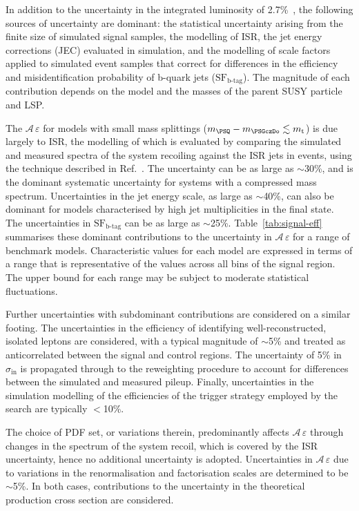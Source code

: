 In addition to the uncertainty in the integrated luminosity of
2.7\%~\cite{CMS:2016eto}, the following sources of uncertainty are
dominant: the statistical uncertainty arising from the finite size of
simulated signal samples, the modelling of ISR, the jet energy
corrections (JEC) evaluated in simulation, and the modelling of scale
factors applied to simulated event samples that correct for
differences in the efficiency and misidentification probability of
b-quark jets ($\text{SF}_\text{b-tag}$). The magnitude of each
contribution depends on the model and the masses of the parent
SUSY particle and LSP.

The $\mathcal{A}\,\varepsilon$ for models with small mass
splittings (\eg $m_{\PSQ} - m_{\PSGczDo} \lesssim m_{\text t}$) is due
largely to ISR, the modelling of which is evaluated by comparing the
simulated and measured \pt spectra of the system recoiling against the
ISR jets in \ttbar events, using the technique described in
Ref.~\cite{single-lepton-stop}. The uncertainty can be as large as
$\sim$30\%, and is the dominant systematic uncertainty for systems
with a compressed mass spectrum. Uncertainties in the jet energy
scale, as large as $\sim$40\%, can also be dominant for models
characterised by high jet multiplicities in the final state. The
uncertainties in $\text{SF}_\text{b-tag}$ can be as large as
$\sim$25\%. Table~\ref{tab:signal-eff} summarises these dominant
contributions to the uncertainty in $\mathcal{A}\,\varepsilon$ for
a range of benchmark models. Characteristic values for each model are
expressed in terms of a range that is representative of the values
across all bins of the signal region. The upper bound for each range
may be subject to moderate statistical fluctuations.

Further uncertainties with subdominant contributions are considered on
a similar footing. The uncertainties in the efficiency of identifying
well-reconstructed, isolated leptons are considered, with a typical
magnitude of $\sim$5\% and treated as anticorrelated between the
signal and control regions. The uncertainty of 5\% in
$\sigma_\text{in}$ is propagated through to the reweighting procedure
to account for differences between the simulated and measured
pileup. Finally, uncertainties in the simulation modelling of the
efficiencies of the trigger strategy employed by the search are
typically $<$10\%.

The choice of PDF set, or variations therein, predominantly affects
$\mathcal{A}\,\varepsilon$ through changes in the \pt spectrum of
the system recoil, which is covered by the ISR uncertainty, hence no
additional uncertainty is adopted. Uncertainties in
$\mathcal{A}\,\varepsilon$ due to variations in the
renormalisation and factorisation scales are determined to be
$\sim$5\%. In both cases, contributions to the uncertainty in the
theoretical production cross section are considered.

